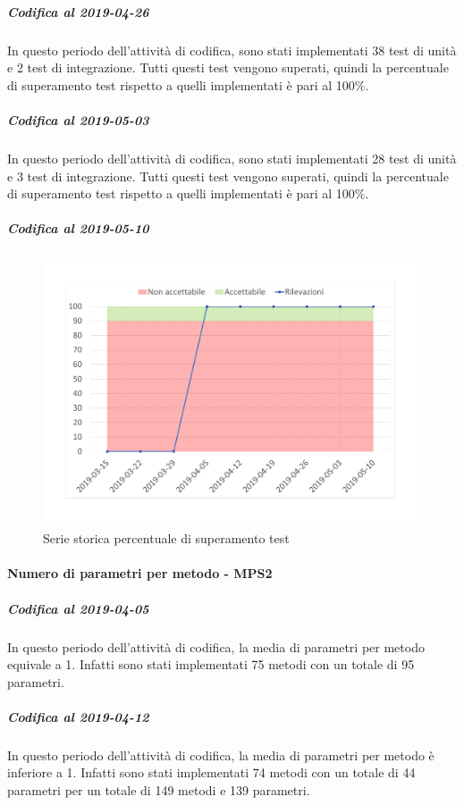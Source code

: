 \subparagraph{Codifica al 2019-04-26}
In questo periodo dell'attività di codifica, sono stati implementati 38 test di unità e 2 test di integrazione. Tutti questi test vengono superati, quindi la percentuale di superamento test rispetto a quelli implementati è pari al 100\%.


\subparagraph{Codifica al 2019-05-03}
In questo periodo dell'attività di codifica, sono stati implementati 28 test di unità e 3 test di integrazione. Tutti questi test vengono superati, quindi la percentuale di superamento test rispetto a quelli implementati è pari al 100\%.

\subparagraph{Codifica al 2019-05-10}



\begin{figure}[H]
	\centering
	\includegraphics[scale=0.6]{images/resoconto/MPS1Chart.pdf}
	\caption{Serie storica percentuale di superamento test}	
\end{figure}

\paragraph{Numero di parametri per metodo - MPS2}
\subparagraph{Codifica al 2019-04-05}
In questo periodo dell'attività di codifica, la media di parametri per metodo equivale a 1. Infatti sono stati implementati 75 metodi con un totale di 95 parametri.

\subparagraph{Codifica al 2019-04-12}
In questo periodo dell'attività di codifica, la media di parametri per metodo è inferiore a 1. Infatti sono stati implementati 74 metodi con un totale di 44 parametri per un totale di 149 metodi e 139 parametri.

